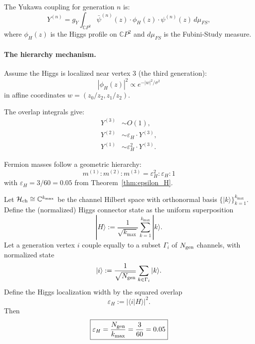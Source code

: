 \begin{theorem}\label{thm:yukawa}
The Yukawa coupling for generation $n$ is:
\begin{equation}
Y^{(n)} = g_Y \int_{\mathbb{C}P^2} \bar{\psi}^{(n)}(z) \cdot \phi_H(z) \cdot \psi^{(n)}(z) \, d\mu_{FS},
\end{equation}
where $\phi_H(z)$ is the Higgs profile on $\mathbb{C}P^2$ and $d\mu_{FS}$ is the Fubini-Study measure.
\end{theorem}

\paragraph{The hierarchy mechanism.}
Assume the Higgs is localized near vertex 3 (the third generation):
\begin{equation}
|\phi_H(z)|^2 \propto e^{-|w|^2/\sigma^2}
\end{equation}
in affine coordinates $w = (z_0/z_2, z_1/z_2)$.

The overlap integrals give:
\begin{align}
Y^{(3)} &\sim O(1), \\
Y^{(2)} &\sim \varepsilon_H \cdot Y^{(3)}, \\
Y^{(1)} &\sim \varepsilon_H^2 \cdot Y^{(3)}.
\end{align}

\begin{corollary}
Fermion masses follow a geometric hierarchy:
\begin{equation}
\boxed{m^{(1)} : m^{(2)} : m^{(3)} = \varepsilon_H^2 : \varepsilon_H : 1}
\end{equation}
with $\varepsilon_H = 3/60 = 0.05$ from Theorem~\ref{thm:epsilon_H}.
\end{corollary}

\begin{theorem}\label{thm:epsilon_H}
Let $\mathcal{H}_{\rm ch}\cong \mathbb{C}^{k_{\max}}$ be the channel Hilbert space 
with orthonormal basis $\{|k\rangle\}_{k=1}^{k_{\max}}$.
Define the (normalized) Higgs connector state as the uniform superposition
\begin{equation}
|H\rangle := \frac{1}{\sqrt{k_{\max}}}\sum_{k=1}^{k_{\max}} |k\rangle .
\end{equation}
Let a generation vertex $i$ couple equally to a subset $\Gamma_i$ of $N_{\rm gen}$ 
channels, with normalized state
\begin{equation}
|i\rangle := \frac{1}{\sqrt{N_{\rm gen}}}\sum_{k\in\Gamma_i} |k\rangle .
\end{equation}
Define the Higgs localization width by the squared overlap
\begin{equation}
\varepsilon_H := |\langle i|H\rangle|^2 .
\end{equation}
Then
\begin{equation}\label{eq:epsilon_H_derived}
\boxed{\varepsilon_H = \frac{N_{\rm gen}}{k_{\max}} = \frac{3}{60} = 0.05}
\end{equation}
\end{theorem}

